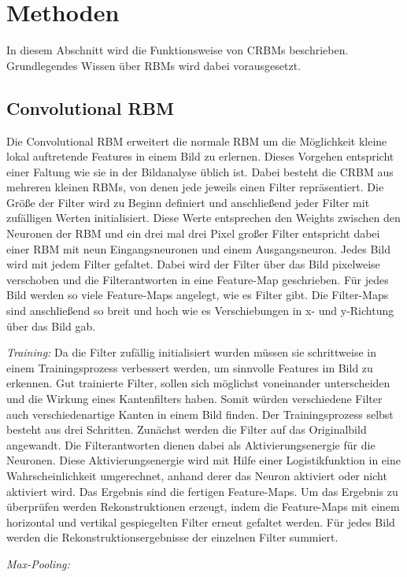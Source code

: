 \section{Methoden}\label{methods}
In diesem Abschnitt wird die Funktionsweise von CRBMs beschrieben.
Grundlegendes Wissen über RBMs wird dabei vorausgesetzt.

\subsection{Convolutional RBM}\label{CRBM}
Die Convolutional RBM erweitert die normale RBM um die Möglichkeit kleine lokal auftretende Features in einem Bild zu erlernen.
Dieses Vorgehen entspricht einer Faltung wie sie in der Bildanalyse üblich ist.
Dabei besteht die CRBM aus mehreren kleinen RBMs, von denen jede jeweils einen Filter repräsentiert.
Die Größe der Filter wird zu Beginn definiert und anschließend jeder Filter mit zufälligen Werten initialisiert.
Diese Werte entsprechen den Weights zwischen den Neuronen der RBM und ein drei mal drei Pixel großer Filter entspricht dabei einer RBM mit neun Eingangsneuronen und einem Ausgangsneuron.
Jedes Bild wird mit jedem Filter gefaltet.
Dabei wird der Filter über das Bild pixelweise verschoben und die Filterantworten in eine Feature-Map geschrieben.
Für jedes Bild werden so viele Feature-Maps angelegt, wie es Filter gibt.
Die Filter-Maps sind anschließend so breit und hoch wie es Verschiebungen in x- und y-Richtung über das Bild gab.

\textit{Training:}
Da die Filter zufällig initialisiert wurden müssen sie schrittweise in einem Trainingsprozess verbessert werden, um sinnvolle Features im Bild zu erkennen.
Gut trainierte Filter, sollen sich möglichst voneinander unterscheiden und die Wirkung eines Kantenfilters haben.
Somit würden verschiedene Filter auch verschiedenartige Kanten in einem Bild finden.
Der Trainingsprozess selbst besteht aus drei Schritten.
Zunächst werden die Filter auf das Originalbild angewandt.
Die Filterantworten dienen dabei als Aktivierungsenergie für die Neuronen.
Diese Aktivierungsenergie wird mit Hilfe einer Logistikfunktion in eine Wahrscheinlichkeit umgerechnet, anhand derer das Neuron aktiviert oder nicht aktiviert wird.
Das Ergebnis sind die fertigen Feature-Maps.
Um das Ergebnis zu überprüfen werden Rekonstruktionen erzeugt, indem die Feature-Maps mit einem horizontal und vertikal gespiegelten Filter erneut gefaltet werden.
Für jedes Bild werden die Rekonstruktionsergebnisse der einzelnen Filter summiert.

\textit{Max-Pooling:}